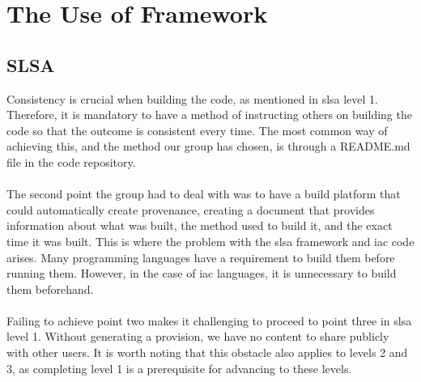 \section{The Use of Framework}
\subsection{SLSA}
Consistency is crucial when building the code, as mentioned in \acrshort{slsa} level 1. Therefore, it is mandatory to have a method of instructing others on building the code so that the outcome is consistent every time. The most common way of achieving this, and the method our group has chosen, is through a README.md file in the code repository. 
\\~\\
The second point the group had to deal with was to have a build platform that could automatically create \gls{provenance}, creating a document that provides information about what was built, the method used to build it, and the exact time it was built. This is where the problem with the \acrshort{slsa} framework and \acrshort{iac} code arises. Many programming languages have a requirement to build them before running them. However, in the case of \acrshort{iac} languages, it is unnecessary to build them beforehand.
\\~\\
Failing to achieve point two makes it challenging to proceed to point three in \acrshort{slsa} level 1. Without generating a provision, we have no content to share publicly with other users. It is worth noting that this obstacle also applies to levels 2 and 3, as completing level 1 is a prerequisite for advancing to these levels.


